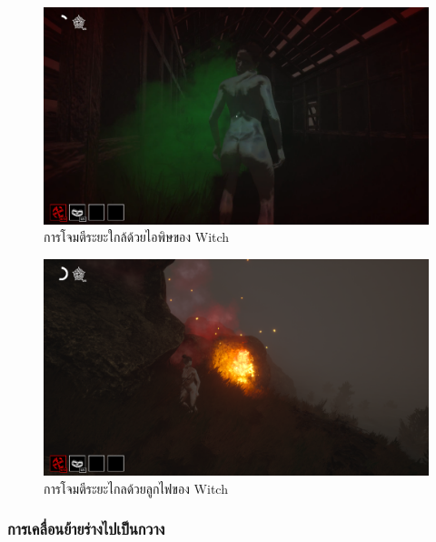 \begin{figure}[p]
  \begin{center}
  \includegraphics[width=\textwidth]{./img/mechanics/breath_of_death.png}
  \end{center}
    \caption[การโจมตีระยะใกล้ด้วยไอพิษของ Witch]{การโจมตีระยะใกล้ด้วยไอพิษของ Witch}
    \label{fig:short_range_attack}    
\end{figure}

\begin{figure}[p]
  \begin{center}
  \includegraphics[width=\textwidth]{./img/mechanics/inferno_soul.png}
  \end{center}
    \caption[การโจมตีระยะไกลด้วยลูกไฟของ Witch]{การโจมตีระยะไกลด้วยลูกไฟของ Witch}\label{การโจมตีระยะไกลด้วยลูกไฟ}
    \label{fig:long_range_attack}
\end{figure}

\subsubsection{การเคลื่อนย้ายร่างไปเป็นกวาง}

